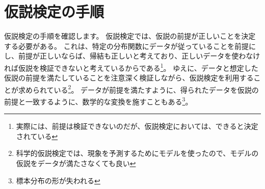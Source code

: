 \section{仮説検定の手順}
仮説検定の手順を確認します。
仮説検定では、仮説の前提が正しいことを決定する必要がある。
これは、特定の分布関数にデータが従っていることを前提にし、前提が正しいならば、帰結も正しいと考えており、正しいデータを使わなければ仮説を検証できないと考えているからである\footnote{実際には、前提は検証できないのだが、仮説検定においては、できると決定されている}。%
ゆえに、データと想定した仮説の前提を満たしていることを注意深く検証しながら、仮説検定を利用することが求められている\footnote{科学的仮説検定では、現象を予測するためにモデルを使ったので、モデルの仮説をデータが満たさなくても良い}。
データが前提を満たすように、得られたデータを仮説の前提と一致するように、数学的な変換を施すこともある\footnote{標本分布の形が失われる}。

